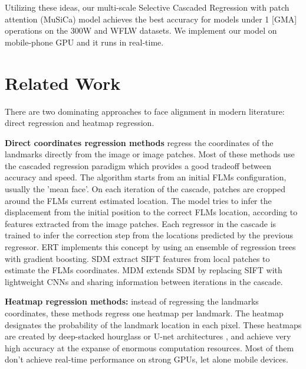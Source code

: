 \documentclass[9pt,twocolumn]{extarticle}
\begin{document}
Utilizing these ideas, our multi-scale Selective Cascaded Regression with patch attention (MuSiCa) model achieves the best accuracy for models under 1 [GMA] operations on the 300W and WFLW datasets. We implement our model on mobile-phone GPU and it runs in real-time.



\section{Related Work}

There are two dominating approaches to face alignment in modern literature: direct regression and heatmap regression.

\textbf{Direct coordinates regression methods} regress the coordinates of the landmarks directly from the image or image patches. Most of these methods use the cascaded regression paradigm \cite{wu2017facial, mahpod2021facial, lee2015face, trigeorgis2016mnemonic, kazemi2014one, xiong2013supervised} which provides a good tradeoff between accuracy and speed. The algorithm starts from an initial FLMs configuration, usually the 'mean face'. On each iteration of the cascade, patches are cropped around the FLMs current estimated location. The model tries to infer the displacement from the initial position to the correct FLMs location, according to features extracted from the image patches. Each regressor in the cascade is trained to infer the correction step from the locations predicted by the previous regressor. ERT \cite{kazemi2014one} implements this concept by using an ensemble of regression trees with gradient boosting. SDM \cite{xiong2013supervised} extract SIFT features from local patches to estimate the FLMs coordinates. MDM \cite{trigeorgis2016mnemonic} extends SDM by replacing SIFT with lightweight CNNs and sharing information between iterations in the cascade. 

\textbf{Heatmap regression methods:} instead of regressing the landmarks coordinates, these methods regress one heatmap per landmark. The heatmap designates the probability of the landmark location in each pixel. These heatmaps are created by deep-stacked hourglass \cite{chen2019face, liu2019semantic, wu2018look} or U-net architectures \cite{dapogny2019decafa}, and achieve very high accuracy at the expanse of enormous computation resources. Most of them don't achieve real-time performance on strong GPUs, let alone mobile devices.
\end{document}
